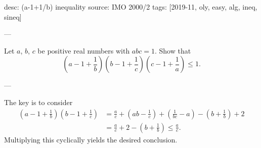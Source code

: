 desc: (a-1+1/b) inequality
source: IMO 2000/2
tags: [2019-11, oly, easy, alg, ineq, sineq]

---

Let $a$, $b$, $c$ be positive real numbers with $abc=1$. Show that \[\left(a-1+\frac1b\right)\left(b-1+\frac1c\right)\left(c-1+\frac1a\right)\le1.\]

---

The key is to consider
\begin{align*}
    \left(a-1+\frac1b\right)\left(b-1+\frac1c\right)&=\frac ac+\left(ab-\frac1c\right)+\left(\frac1{bc}-a\right)-\left(b+\frac1b\right)+2\\
    &=\frac ac+2-\left(b+\frac1b\right)\le\frac ac.
\end{align*}
Multiplying this cyclically yields the desired conclusion.
